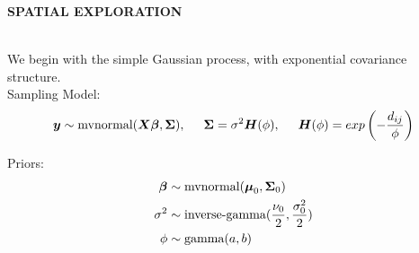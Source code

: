 \documentclass[12pt]{article}
\newcommand{\bfy}{\mbox{\boldmath $y$}}
\newcommand{\bfX}{\mbox{\boldmath $X$}}
\newcommand{\bfb}{\mbox{\boldmath $\beta$}}
\newcommand{\bfS}{\mbox{\boldmath $\Sigma$}}
\newcommand{\bfu}{\mbox{\boldmath $\mu$}}
\begin{document}

\begin{center}
{\Large \bfseries \textsc{SPATIAL EXPLORATION}}	\\
\end{center}


 \\	

\noindent We begin with the simple Gaussian process, with exponential covariance structure. \\

\noindent Sampling Model:
\begin{equation*}
\begin{split}
\bfy \sim \text{mvnormal}(\bfX\bfb, \boldsymbol{\Sigma}), \hspace{5mm} \boldsymbol{\Sigma} = \sigma^2\boldsymbol{H}(\phi), \hspace{5mm} \boldsymbol{H}(\phi) = exp\left(-\frac{d_{ij}}{\phi}\right)
\end{split}
\end{equation*}

\noindent Priors:
\begin{equation*}
\begin{split}
\bfb &\sim \text{mvnormal}(\bfu_0, \bfS_0) \\
\sigma^2 &\sim \text{inverse-gamma}(\frac{\nu_0}{2}, \frac{\sigma_0^2}{2}) \\
\phi &\sim \text{gamma}(a,b)
\end{split}
\end{equation*}
	
\newpage
{}
\end{document}
